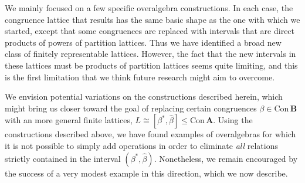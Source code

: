\documentclass[cm,dissertation]{uhthesis}
\theoremstyle{plain}
\theoremstyle{definition}
\theoremstyle{remark}
\numberwithin{theorem}{section}
\numberwithin{claim}{chapter}
\numberwithin{equation}{section}
\numberwithin{conjecture}{chapter}
\newcommand{\<}{\ensuremath{\langle}}
\renewcommand{\>}{\ensuremath{\rangle}}
\renewcommand{\leq}{\ensuremath{\leqslant}}
\newcommand{\Con}{\ensuremath{\mathrm{Con\,}}}
\newcommand{\0}{\ensuremath{\mathbf{0}}}
\newcommand{\1}{\ensuremath{\mathbf{1}}}
\newcommand{\2}{\ensuremath{\mathbf{2}}}
\newcommand{\3}{\ensuremath{\mathbf{3}}}
\newcommand{\4}{\ensuremath{\mathbf{4}}}
\newcommand{\5}{\ensuremath{\mathbf{5}}}
\newcommand{\bA}{\ensuremath{\mathbf{A}}}
\newcommand{\bB}{\ensuremath{\mathbf{B}}}
\begin{document}
  We mainly focused on a few specific overalgebra constructions.
  In each case, the congruence lattice that results has the same basic shape as
  the one with which we started, except that some congruences are replaced with
  intervals that are direct products of powers of partition lattices.  
  Thus we have identified a broad new class of finitely representable lattices.  
  However, the fact that the new intervals in these lattices must be products of
  partition lattices seems quite limiting, and this is the first limitation that we
  think future research might aim to overcome.  

  We envision potential variations on the constructions described herein,
  which might bring us closer toward the goal of replacing certain congruences
  $\beta\in \Con \bB$ with an more general finite lattices,
  $L\cong [\beta^*, \widehat{\beta}] \leq \Con \bA$.
  Using the constructions described above, we have found examples of overalgebras
  for which it is not possible to simply add operations 
  in order to eliminate \emph{all} relations strictly contained in the interval
  $(\beta^*,  \widehat{\beta})$.
  Nonetheless, we remain encouraged by the success of a very modest example
  in this direction, which we now describe.
\end{document}
